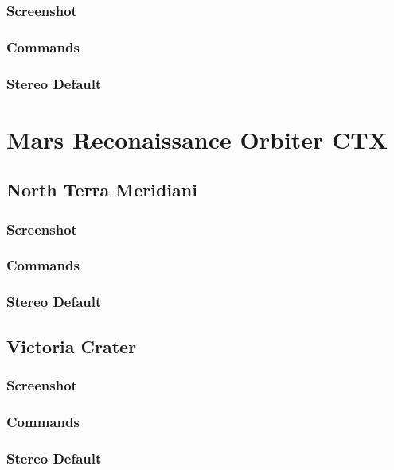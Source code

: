 \subsubsection*{Screenshot}

\subsubsection*{Commands}

\subsubsection*{Stereo Default}

\section{Mars Reconaissance Orbiter CTX}

\subsection{North Terra Meridiani}

\subsubsection*{Screenshot}

\subsubsection*{Commands}

\subsubsection*{Stereo Default}

\subsection{Victoria Crater}

\subsubsection*{Screenshot}

\subsubsection*{Commands}

\subsubsection*{Stereo Default}

